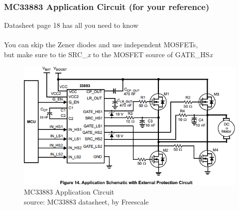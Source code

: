 \documentclass{beamer}
\begin{document}
\begin{frame}
\frametitle{MC33883 Application Circuit \small (for your reference)}
\centering
Datasheet page 18 has all you need to know \\
\hfill \\
You can skip the Zener diodes and use independent MOSFETs, \\
but make sure to tie SRC\_\textit{x} to the MOSFET source of GATE\_HS\textit{x}
\begin{figure}
  \centering
  \includegraphics[width=0.5\columnwidth]{images-dis3/mc33883-application} \\
  MC33883 Application Circuit \\
  {\tiny source: MC33883 datasheet, by Freescale}
\end{figure}
\end{frame}
\end{document}
